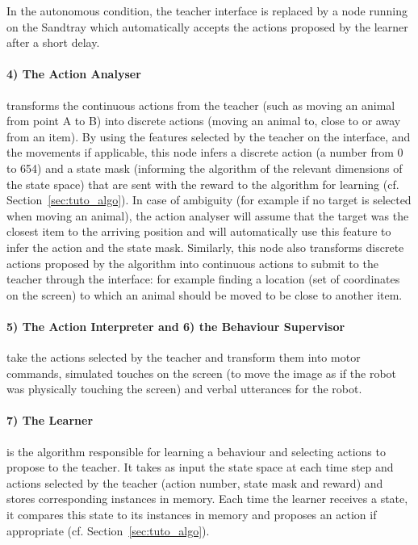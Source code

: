In the autonomous condition, the teacher interface is replaced by a node running on the Sandtray which automatically accepts the actions proposed by the learner after a short delay.

\paragraph{4) The Action Analyser}
 transforms the continuous actions from the teacher (such as moving an animal from point A to B) into discrete actions (moving an animal to, close to or away from an item). By using the features selected by the teacher on the interface, and the movements if applicable, this node infers a discrete action (a number from 0 to 654) and a state mask (informing the algorithm of the relevant dimensions of the state space) that are sent with the reward to the algorithm for learning (cf. Section~\ref{sec:tuto_algo}). In case of ambiguity (for example if no target is selected when moving an animal), the action analyser will assume that the target was the closest item to the arriving position and will automatically use this feature to infer the action and the state mask. Similarly, this node also transforms discrete actions proposed by the algorithm into continuous actions to submit to the teacher through the interface: for example finding a location (set of coordinates on the screen) to which an animal should be moved to be close to another item.

\paragraph{5) The Action Interpreter and 6) the Behaviour Supervisor}
 take the actions selected by the teacher and transform them into motor commands, simulated touches on the screen (to move the image as if the robot was physically touching the screen) and verbal utterances for the robot.

\paragraph{7) The Learner}
 is the algorithm responsible for learning a behaviour and selecting actions to propose to the teacher. It takes as input the state space at each time step and actions selected by the teacher (action number, state mask and reward) and stores corresponding instances in memory. Each time the learner receives a state, it compares this state to its instances in memory and proposes an action if appropriate (cf. Section~\ref{sec:tuto_algo}).

